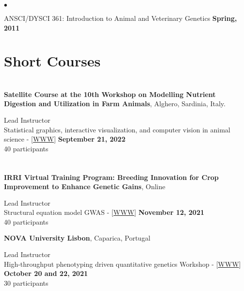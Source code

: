 \documentclass[margin,line,10pt]{res}
\newenvironment{list2}{
  \begin{list}{$\bullet$}{%
      \setlength{\itemsep}{0in}
      \setlength{\parsep}{0in} \setlength{\parskip}{0in}
      \setlength{\topsep}{0in} \setlength{\partopsep}{0in} 
      \setlength{\leftmargin}{0.2in}}}{\end{list}}
\begin{document}
\begin{resume}
\begin{list2}
\vspace{0.5cm}

\item ANSCI/DYSCI 361: Introduction to Animal and Veterinary Genetics    \hfill {\bf Spring, 2011} 

  \end{list2}



\vspace{0.5cm}
\section{\sc Short Courses}
\vspace{1cm}




\section{}


{\bf Satellite Course at the 10th Workshop on Modelling Nutrient Digestion and Utilization in Farm Animals}, Alghero, Sardinia, Italy. 
\vspace{.01pt}

Lead Instructor  \\
Statistical graphics, interactive visualization, and computer vision in animal science - [\textcolor{blue}{\href{http://morotalab.org/MODNUT2022/MODNUT2022.html}{WWW}}] 
 \hfill {\bf September 21, 2022}  \\
40 participants



\section{}


{\bf IRRI Virtual Training Program: Breeding Innovation for Crop Improvement to Enhance Genetic Gains}, Online
\vspace{.01pt}

Lead Instructor  \\
Structural equation model GWAS - [\textcolor{blue}{\href{http://morotalab.org/IRRI2021/day1/day1.html}{WWW}}]
\hfill {\bf November 12, 2021} \\
40 participants



{\bf NOVA University Lisbon}, Caparica, Portugal
\vspace{.01pt}

Lead Instructor  \\
High-throughput phenotyping driven quantitative genetics Workshop - [\textcolor{blue}{\href{http://morotalab.org/CMA-FCT-NOVA2021/CMA-FCT-NOVA2021.html}{WWW}}]
\hfill {\bf October 20 and 22, 2021} \\
30 participants




\end{resume}
\end{document}
